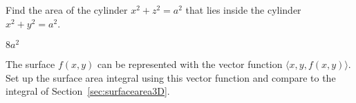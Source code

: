 \begin{enumialphparenastyle}
\begin{ex}
Find the area of the cylinder $x^2+z^2=a^2$ that lies inside
the cylinder $x^2+y^2=a^2$.
\begin{sol}
	$8a^2$
\end{sol}
\end{ex}

\begin{ex}
The surface $f(x,y)$ can be represented with the vector
function $\langle x,y,f(x,y)\rangle$. Set up the surface area integral using
this vector function and compare to the integral of
Section~\ref{sec:surfacearea3D}. 
\end{ex}

\end{enumialphparenastyle}